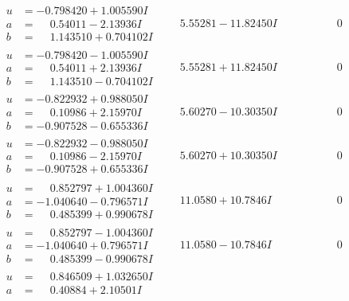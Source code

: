 \documentclass[1p]{elsarticle_modified}
\theoremstyle{definition}
\begin{document}
$$\begin{array}{c|c|c}
 \hline 
\begin{aligned}
u &= -0.798420 + 1.005590 I \\
a &= \phantom{-}0.54011 - 2.13936 I \\
b &= \phantom{-}1.143510 + 0.704102 I\end{aligned}
 & \phantom{-}5.55281 - 11.82450 I & \phantom{-0.000000 } 0 \\ \hline\begin{aligned}
u &= -0.798420 - 1.005590 I \\
a &= \phantom{-}0.54011 + 2.13936 I \\
b &= \phantom{-}1.143510 - 0.704102 I\end{aligned}
 & \phantom{-}5.55281 + 11.82450 I & \phantom{-0.000000 } 0 \\ \hline\begin{aligned}
u &= -0.822932 + 0.988050 I \\
a &= \phantom{-}0.10986 + 2.15970 I \\
b &= -0.907528 - 0.655336 I\end{aligned}
 & \phantom{-}5.60270 - 10.30350 I & \phantom{-0.000000 } 0 \\ \hline\begin{aligned}
u &= -0.822932 - 0.988050 I \\
a &= \phantom{-}0.10986 - 2.15970 I \\
b &= -0.907528 + 0.655336 I\end{aligned}
 & \phantom{-}5.60270 + 10.30350 I & \phantom{-0.000000 } 0 \\ \hline\begin{aligned}
u &= \phantom{-}0.852797 + 1.004360 I \\
a &= -1.040640 - 0.796571 I \\
b &= \phantom{-}0.485399 + 0.990678 I\end{aligned}
 & \phantom{-}11.0580 + 10.7846 I & \phantom{-0.000000 } 0 \\ \hline\begin{aligned}
u &= \phantom{-}0.852797 - 1.004360 I \\
a &= -1.040640 + 0.796571 I \\
b &= \phantom{-}0.485399 - 0.990678 I\end{aligned}
 & \phantom{-}11.0580 - 10.7846 I & \phantom{-0.000000 } 0 \\ \hline\begin{aligned}
u &= \phantom{-}0.846509 + 1.032650 I \\
a &= \phantom{-}0.40884 + 2.10501 I \\

\end{aligned}
\end{array}$$
\end{document}
